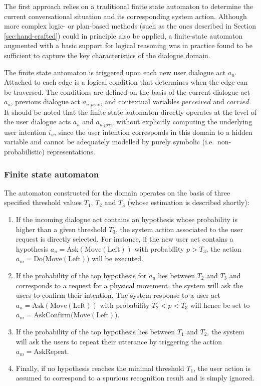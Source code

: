 The first approach relies on a traditional finite state automaton to determine the current conversational situation and its corresponding system action.  Although more complex logic- or plan-based methods (such as the ones described in Section \ref{sec:hand-crafted}) could in principle also be applied, a finite-state automaton augmented with a basic support for logical reasoning was in practice found to be sufficient to capture the key characteristics of the dialogue domain. 

The finite state automaton is triggered upon each new user dialogue act $a_u$. Attached to each edge is a logical condition that determines when the edge can be traversed. The conditions are defined on the basis of the current dialogue act $a_u$, previous dialogue act $a_{u\mbox{-}prev}$, and contextual variables $\mathit{perceived}$ and $\mathit{carried}$. It should be noted that the finite state automaton directly operates at the level of the user dialogue acts $a_u$ and $a_{u\mbox{-}prev}$ without explicitly computing the underlying user intention $i_u$, since the user intention corresponds in this domain to a hidden variable and cannot be adequately modelled by purely symbolic (i.e.\ non-probabilistic) representations. 

\subsubsection*{Finite state automaton}

The automaton constructed for the domain operates on the basis of three specified threshold values $T_1$, $T_2$ and $T_3$ (whose estimation is described shortly):
\begin{enumerate}
\item If the incoming dialogue act contains an hypothesis whose probability is higher than a given threshold $T_3$, the system action associated to the user request is directly selected.  For instance, if the new user act contains a hypothesis $a_u = \mathrm{Ask(Move(Left))}$ with probability $p > T_3$, the action $a_m = \mathrm{Do(Move(Left)})$ will be executed.
\item If the probability of the top hypothesis for $a_u$ lies between $T_2$ and $T_3$ and corresponds to a request for a physical movement, the system will ask the users to confirm their intention.  The system response to a user act $a_u = \mathrm{Ask(Move(Left))}$ with probability $T_2 < p < T_3$ will hence be set to $a_m = \mathrm{AskConfirm(Move(Left)})$.
\item If the probability of the top hypothesis lies between $T_1$ and $T_2$, the system will ask the users to repeat their utterance by triggering the action $a_m = \mathrm{AskRepeat}$. 
\item Finally, if no hypothesis reaches the minimal threshold $T_1$, the user action is assumed to correspond to a spurious recognition result and is simply ignored.
\end{enumerate}

